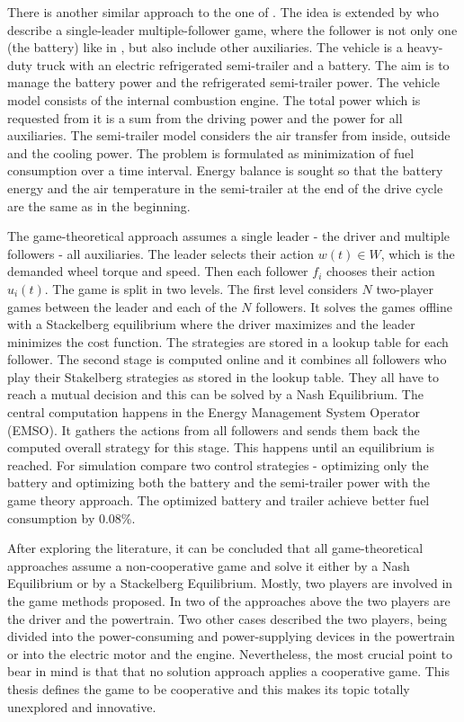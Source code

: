 
There is another similar approach to the one of \citet{dextreit2014game}. The idea is extended by \citet{chen2014game} who describe a single-leader multiple-follower game, where the follower is not only one (the battery) like in \citet{dextreit2014game}, but also include other auxiliaries. The vehicle is a heavy-duty truck with an electric refrigerated semi-trailer and a battery. The aim is to manage the battery power and the refrigerated semi-trailer power. The vehicle model consists of the internal combustion engine. The total power which is requested from it is a sum from the driving power and the power for all auxiliaries. The semi-trailer model considers the air transfer from inside, outside and the cooling power. The problem is formulated as minimization of fuel consumption over a time interval. Energy balance is sought so that the battery energy and the air temperature in the semi-trailer at the end of the drive cycle are the same as in the beginning.

The game-theoretical approach assumes a single leader - the driver and multiple followers - all auxiliaries. The leader selects their action $w(t) \in W$, which is the demanded wheel torque and speed. Then each follower $f_i$ chooses their action $u_i(t)$. The game is split in two levels. The first level considers $N$ two-player games between the leader and each of the $N$ followers. It solves the games offline with a Stackelberg equilibrium where the driver maximizes and the leader minimizes the cost function. The strategies are stored in a lookup table for each follower. The second stage is computed online and it combines all followers who play their Stakelberg strategies as stored in the lookup table. They all have to reach a mutual decision and this can be solved by a Nash Equilibrium. The central computation happens in the Energy Management System Operator (EMSO). It gathers the actions from all followers and sends them back the computed overall strategy for this stage. This happens until an equilibrium is reached. For simulation \citet{chen2014game} compare two control strategies - optimizing only the battery and optimizing both the battery and the semi-trailer power with the game theory approach. The optimized battery and trailer achieve better fuel consumption by 0.08\%.


After exploring the literature, it can be concluded that all game-theoretical approaches assume a non-cooperative game and solve it either by a Nash Equilibrium or by a Stackelberg Equilibrium. Mostly, two players are involved in the game methods proposed. In two of the approaches above the two players are the driver and the powertrain. Two other cases described the two players, being divided into the power-consuming and power-supplying devices in the powertrain or into the electric motor and the engine. Nevertheless, the most crucial point to bear in mind is that that no solution approach applies a cooperative game. This thesis defines the game to be cooperative and this makes its topic totally unexplored and innovative.

